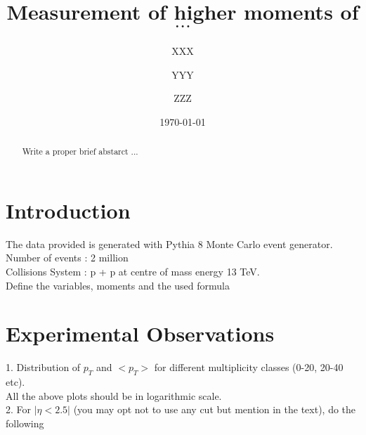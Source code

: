 \documentclass[letterpaper,aps,prc,superscriptaddress,nofootinbib,showpacs,floatfix]{revtex4-1}%
\begin{document}
\title{ Measurement of higher moments of   $\cdots$}
\author{XXX} 
\author{YYY}
\author{ZZZ}



\date{\today}  



\begin{abstract}

Write a proper brief abstarct ...
\end{abstract}

\maketitle

\section{Introduction}


The data provided is generated with Pythia 8  Monte Carlo event generator. \\
Number of events :  2 million \\
Collisions System :  p + p at centre of mass energy 13  TeV.\\


Define  the variables, moments and the used formula \\




\section{Experimental Observations }


1.  Distribution  of  $p_{T}$ and $<p_{T}>$ for different multiplicity classes (0-20, 20-40 etc).  \\

All the above plots should be in logarithmic scale. \\



2. For $|\eta < 2.5|$ (you may opt not to use any cut but mention in the text),  do the following  \\
\end{document}
